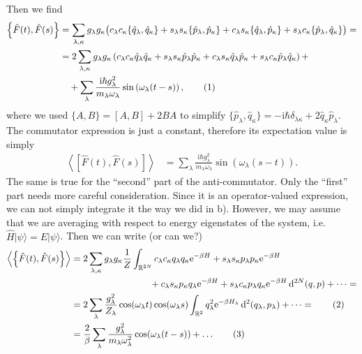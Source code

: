 \documentclass[english, parskip=full]{scrartcl}
\newcommand\numberthis{\addtocounter{equation}{1}\tag{\theequation}}
\newcommand{\bra}{}
\newcommand{\intr}{}
\newcommand{\kla}{}
\newcommand{\klam}{}
\newcommand{\klammer}{}
\newcommand{\Ket}{}
\renewcommand{\i}{\text{i}}
\newcommand{\e}{\text{e}}
\begin{document}
Then we find
\begin{align*}
\klammer\left\{ \hat{F}(t),\hat{F}(s) \right\}&=\sum_{\lambda,\kappa}g_\lambda g_\kappa\big(c_\lambda c_\kappa\{\hat{q}_\lambda,\hat{q}_\kappa\} + s_\lambda s_\kappa\{\hat{p}_\lambda,\hat{p}_\kappa\} + c_\lambda s_\kappa\{\hat{q}_\lambda,\hat{p}_\kappa\} + s_\lambda c_\kappa\{\hat{p}_\lambda,\hat{q}_\kappa\}\big)=\\
&=2\sum_{\lambda,\kappa}g_\lambda g_\kappa\kla\left( c_\lambda c_\kappa\hat{q}_\lambda\hat{q}_\kappa + s_\lambda s_\kappa\hat{p}_\lambda\hat{p}_\kappa + c_\lambda s_\kappa\hat{q}_\lambda\hat{p}_\kappa  + s_\lambda c_\kappa\hat{p}_\lambda\hat{q}_\kappa \right)+\\
&\ \ \ +\sum_\lambda  \frac{\i\hbar g_\lambda^2}{m_\lambda\omega_\lambda}\sin\kla\left( \omega_\lambda (t-s) \right), \numberthis
\end{align*}
where we used $\{A,B\}=[A,B]+2BA$ to simplify $\{\hat{p}_\lambda,\hat{q}_\kappa\} = -\i\hbar\delta_{\lambda\kappa}+2\hat{q}_\kappa\hat{p}_\lambda$.
The commutator expression is just a constant, therefore its expectation value is simply 
\begin{align}
\bra\left\langle \klam\left[ \hat{F}(t),\hat{F}(s) \right] \right\rangle &= \sum_\lambda\frac{\i\hbar g_\lambda^2}{m_\lambda\omega_\lambda}\sin\kla\left( \omega_\lambda (s-t) \right).
\end{align}
The same is true for the ``second'' part of the anti-commutator.
Only the ``first'' part needs more careful consideration.
Since it is an operator-valued expression, we can not simply integrate it the way we did in b).
However, we may assume that we are averaging with respect to energy eigenstates of the system, i.e. $\hat{H}\Ket | \psi \rangle=E\Ket | \psi \rangle$.
Then we can write (or can we?)
\begin{align*}
\bra\left\langle \klammer\left\{ \hat{F}(t),\hat{F}(s) \right\}  \right\rangle &= 2\sum_{\lambda,\kappa}g_\lambda g_\kappa\frac{1}{Z}\intr\int_{\mathbb{R}^{2N}}  c_\lambda c_\kappa q_\lambda q_\kappa \e^{-\beta H} + s_\lambda s_\kappa p_\lambda p_\kappa\e^{-\beta H} \\
&\hspace{3cm}+ c_\lambda s_\kappa p_\kappa q_\lambda\e^{-\beta H}  + s_\lambda c_\kappa p_\lambda q_\kappa\e^{-\beta H} \, \mathrm{d}^{2N}(q,p) + \dots=\\
&=2\sum_\lambda \frac{g_\lambda^2}{Z_\lambda}\cos(\omega_\lambda t)\cos(\omega_\lambda s)\intr\int_{\mathbb{R}^{2}} q_\lambda^2\e^{-\beta H_\lambda} \, \mathrm{d}^{2}(q_\lambda,p_\lambda)+\dots=\numberthis\\
&=\frac{2}{\beta}\sum_\lambda\frac{g_\lambda^2}{m_\lambda\omega_\lambda^2}\cos (\omega_\lambda (t-s))+\dots\numberthis
\end{align*}
\end{document}
